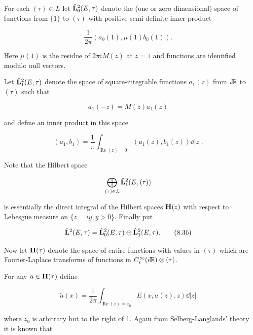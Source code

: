 For each $(\tau) \in L$ let $\hat{\mathbf{L}}_{0}^{2}(E,\tau)$ denote the (one or zero dimensional) space of functions from $\{1\}$ to $(\tau)$ with positive semi-definite inner product

\begin{equation}\label{eq:8.33}
\frac{1}{2\pi}\left(a_{0}(1), \mu(1)b_{0}(1)\right).\tag{8.33}
\end{equation}

Here $\mu(1)$ is the residue of $2\pi i M(z)$ at $z = 1$ and functions are identified modulo null vectors.

Let $\hat{\mathbf{L}}_{1}^{2}(E,\tau)$ denote the space of square-integrable functions $a_{1}(z)$ from $i\mathbb{R}$ to $(\tau)$ such that

\begin{equation}\label{eq:8.34}
a_{1}(-z) = M(z)a_{1}(z)\tag{8.34}
\end{equation}

and define an inner product in this space

\begin{equation}\label{eq:8.35}
(a_{1}, b_{1}) = \frac{1}{\pi}\int_{\operatorname{Re}(z) = 0} (a_{1}(z), b_{1}(z)) \dd|z|.\tag{8.35}
\end{equation}

Note that the Hilbert space

\[
\bigoplus_{(\tau) \in L} \hat{\mathbf{L}}_{1}^{2}(E,(\tau))
\]

is essentially the direct integral of the Hilbert spaces $\mathbf{H}(z)$ with respect to Lebesgue measure on $\{z = iy, y > 0\}$. Finally put

\begin{equation}\label{eq:8.36}
\hat{\mathbf{L}}^{2}(E,\tau) = \hat{\mathbf{L}}_{0}^{2}(E,\tau) \oplus \hat{\mathbf{L}}_{1}^{2}(E,\tau).\tag{8.36}
\end{equation}

Now let $\mathbf{H}(\tau)$ denote the space of entire functions with values in $(\tau)$ which are Fourier-Laplace transforms of functions in $C_{c}^{\infty}(i\mathbb{R}) \otimes (\tau)$.

For any $a \in \mathbf{H}(\tau)$ define

\begin{equation}\label{eq:8.37}
\tilde{a}(x) = \frac{1}{2\pi}\int_{\operatorname{Re}(z) = z_{0}} E(x,a(z),z) \dd|z|\tag{8.37}
\end{equation}

where $z_{0}$ is arbitrary but to the right of 1. Again from Selberg-Langlands' theory it is known that

